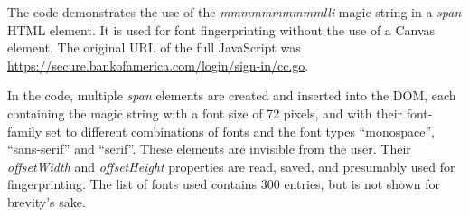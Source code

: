 \documentclass[
    fontsize=12pt,
    headings=small,
    parskip=half,
    bibliography=totoc,
    numbers=noenddot,
    open=any
    ]{scrreprt}
\begin{document}
\begin{appendices}
The code demonstrates the use of the \textit{mmmmmmmmmmlli} magic string in a \textit{span} HTML element.
It is used for font fingerprinting without the use of a Canvas element.
The original URL of the full JavaScript was \url{https://secure.bankofamerica.com/login/sign-in/cc.go}.

In the code, multiple \textit{span} elements are created and inserted into the DOM,
each containing the magic string with a font size of 72 pixels, and with their font-family
set to different combinations of fonts and the font types ``monospace'', ``sans-serif'' and ``serif''.
These elements are invisible from the user.
Their \textit{offsetWidth} and \textit{offsetHeight} properties are read, saved, and presumably
used for fingerprinting.
The list of fonts used contains 300 entries, but is not shown for brevity's sake.


\end{appendices}

\clearpage

\printbibliography
\end{document}
